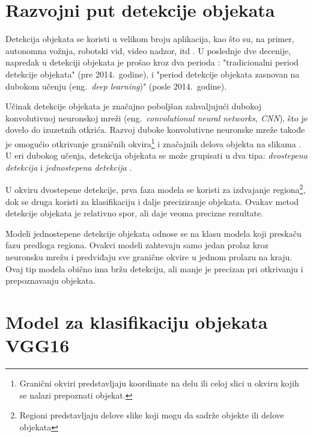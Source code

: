 \documentclass[12pt,oneside]{memoir}
\begin{document}
\section{Razvojni put detekcije objekata}
\label{section2_detekcijaobjekta}


Detekcija objekata se koristi u velikom broju aplikacija, kao što su, na primer, autonomna vožnja, robotski vid, video nadzor, itd \cite{zou2019object}. U poslednje dve decenije, napredak u detekciji objekata je prošao kroz dva perioda \cite{zou2019object}: "tradicionalni period detekcije objekata" (pre 2014.~godine), i "period detekcije objekata zasnovan na dubokom učenju (eng.~\textit{deep learning})" (posle 2014.~godine).


Učinak detekcije objekata je značajno poboljšan zahvaljujući dubokoj konvolutivnoj neuronskoj mreži (eng.~\textit{convolutional neural networks, CNN}), što je dovelo do izuzetnih otkrića.
Razvoj duboke konvolutivne neuronske mreže takođe je omogućio otkrivanje graničnih okvira\footnote{Granični okviri predstavljaju koordinate na delu ili celoj slici u okviru kojih se nalazi prepoznati objekat.} i značajnih delova objekta na slikama \cite{girshick2014rich, ren2015faster, kang2017t, amit2020object}.
U eri dubokog učenja, detekcija objekata se može grupisati u dva tipa: \textit{dvostepena detekcija} i \textit{jednostepena detekcija}  \cite{zou2019object}.

U okviru dvostepene detekcije, prva faza modela se koristi za izdvajanje regiona\footnote{Regioni predstavljaju delove slike koji mogu da sadrže objekte ili delove objekata}, dok se druga koristi za klasifikaciju i dalje preciziranje objekata. Ovakav metod detekcije objekata je relativno spor, ali daje veoma precizne rezultate.

Modeli jednostepene detekcije objekata odnose se na klasu modela koji preskaču fazu predloga regiona. Ovakvi modeli zahtevaju samo jedan prolaz kroz neuronsku mrežu i predviđaju sve granične okvire u jednom prolazu na kraju. Ovaj tip modela obično ima bržu detekciju, ali manje je precizan pri otkrivanju i prepoznavanju objekata.


\section{Model za klasifikaciju objekata VGG16}
\end{document}
